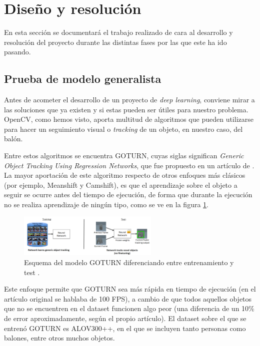 \section{Diseño y resolución}

En esta sección se documentará el trabajo realizado de cara al desarrollo y resolución del proyecto durante las distintas fases por las que este ha ido pasando.

\subsection{Prueba de modelo generalista}

Antes de acometer el desarrollo de un proyecto de \textit{deep learning}, conviene mirar a las soluciones que ya existen y si estas pueden ser útiles para nuestro problema. OpenCV, como hemos visto, aporta multitud de algoritmos que pueden utilizarse para hacer un seguimiento visual o \textit{tracking} de un objeto, en nuestro caso, del balón.

Entre estos algoritmos se encuentra GOTURN, cuyas siglas significan \textit{Generic Object Tracking Using Regression Networks}, que fue propuesto en un artículo de \citet{art:goturn}. La mayor aportación de este algoritmo respecto de otros enfoques más clásicos (por ejemplo, Meanshift y Camshift), es que el aprendizaje sobre el objeto a seguir se ocurre antes del tiempo de ejecución, de forma que durante la ejecución no se realiza aprendizaje de ningún tipo, como se ve en la figura \ref{fig:goturn1}.

\begin{figure}[H]
	\centering
  \includegraphics[width=0.6\textwidth]{images/goturn}
	\caption{Esquema del modelo GOTURN diferenciando entre entrenamiento y test \cite{art:goturn}.}
  \label{fig:goturn1}
\end{figure}

Este enfoque permite que GOTURN sea más rápida en tiempo de ejecución (en el artículo original se hablaba de 100 FPS), a cambio de que todos aquellos objetos que no se encuentren en el dataset funcionen algo peor (una diferencia de un 10\% de error aproximadamente, según el propio artículo). El dataset sobre el que se entrenó GOTURN es ALOV300++, en el que se incluyen tanto personas como balones, entre otros muchos objetos.

